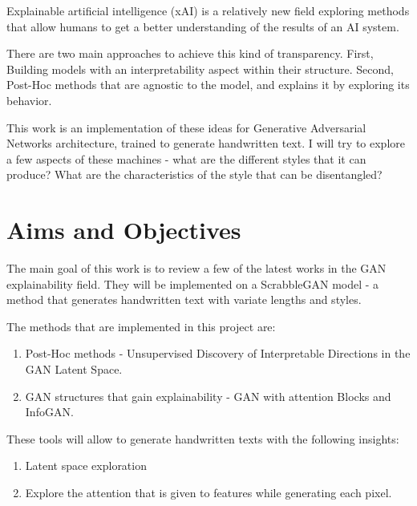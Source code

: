 Explainable artificial intelligence (xAI) is a relatively new field exploring methods that allow humans to get a better understanding of the results of an AI system. 

There are two main approaches to achieve this kind of transparency. First, Building models with an interpretability aspect within their structure. Second, Post-Hoc methods that are agnostic to the model, and explains it by exploring its behavior.

This work is an implementation of these ideas for Generative Adversarial Networks architecture, trained to generate handwritten text.
I will try to explore a few aspects of these machines - what are the different styles that it can produce? What are the characteristics of the style that can be disentangled?


\section{Aims and Objectives}

The main goal of this work is to review a few of the latest works in the GAN explainability field. They will be implemented on a ScrabbleGAN model - a method that generates handwritten text with variate lengths and styles.

The methods that are implemented in this project are:

\begin{enumerate}
	\item Post-Hoc methods - Unsupervised Discovery of Interpretable Directions in the GAN Latent Space.
	
	\item GAN structures that gain explainability - GAN with attention Blocks and InfoGAN.
	
\end{enumerate}

These tools will allow to generate handwritten texts with the following insights:

\begin{enumerate}
	\item Latent space exploration
	\item Explore the attention that is given to features while generating each pixel.
\end{enumerate}
